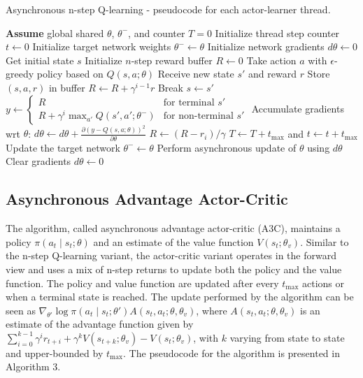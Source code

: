 \documentclass{article}
\begin{document}
\begin{algorithm}[H]
    \caption{Asynchronous n-step Q-learning - pseudocode for each actor-learner thread.}
    \begin{algorithmic}[1]
    \State \textbf{Assume} global shared $\theta$, $\theta^{-}$, and counter $T = 0$
    \State Initialize thread step counter $t \gets 0$
    \State Initialize target network weights $\theta^{-} \gets \theta$
    \State Initialize network gradients $d\theta \gets 0$
    \State Get initial state $s$
    \Repeat
        \State Initialize $n$-step reward buffer $R \gets 0$
            \State Take action $a$ with $\epsilon$-greedy policy based on $Q(s, a; \theta)$
            \State Receive new state $s'$ and reward $r$
            \State Store $(s, a, r)$ in buffer
            \State $R \gets R + \gamma^{i-1} r$
                \State Break
            \EndIf
            \State $s \gets s'$
        \EndFor
            \State $y \gets 
                \begin{cases} 
                  R & \text{for terminal } s' \\
                  R + \gamma^i \max_{a'} Q(s', a'; \theta^-) & \text{for non-terminal } s'
                \end{cases}$
            \State Accumulate gradients wrt $\theta$: $d\theta \gets d\theta + \frac{\partial (y - Q(s, a; \theta))^2}{\partial \theta}$
            \State $R \gets (R - r_i) / \gamma$
        \EndFor
        \State $T \gets T + t_{\text{max}}$ and $t \gets t + t_{\text{max}}$
            \State Update the target network $\theta^- \gets \theta$
        \EndIf
            \State Perform asynchronous update of $\theta$ using $d\theta$
            \State Clear gradients $d\theta \gets 0$
        \EndIf
    \end{algorithmic}
\end{algorithm}

\subsection{Asynchronous Advantage Actor-Critic}
The algorithm, called asynchronous advantage actor-critic (A3C), maintains a policy \(\pi(a_t \mid s_t; \theta)\) and an estimate of the value function \(V(s_t; \theta_v)\). Similar to the n-step Q-learning variant, the actor-critic variant operates in the forward view and uses a mix of n-step returns to update both the policy and the value function. The policy and value function are updated after every \(t_{\text{max}}\) actions or when a terminal state is reached. The update performed by the algorithm can be seen as \(\nabla_{\theta'} \log \pi(a_t \mid s_t; \theta') A(s_t, a_t; \theta, \theta_v)\), where \(A(s_t, a_t; \theta, \theta_v)\) is an estimate of the advantage function given by \(\sum_{i=0}^{k-1} \gamma^i r_{t+i} + \gamma^k V(s_{t+k}; \theta_v) - V(s_t; \theta_v)\), with \(k\) varying from state to state and upper-bounded by \(t_{\text{max}}\). The pseudocode for the algorithm is presented in Algorithm 3.
\end{document}
